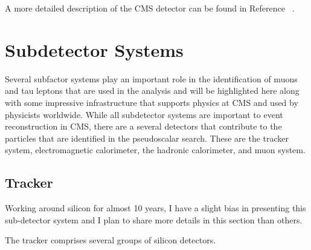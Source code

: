 


A more detailed description of the CMS detector can be found in Reference ~\cite{Chatrchyan:2008zzk}.



\section{Subdetector Systems}
Several subfactor systems play an important role in the identification of muons and tau leptons that are used in the analysis and will be highlighted here along with some impressive infrastructure that supports physics at CMS and used by physicists worldwide. 
While all subdetector systems are important to event reconstruction in CMS, there are a several detectors that contribute to the particles that are identified in the pseudoscalar search. These are the tracker system, electromagnetic calorimeter, the hadronic calorimeter, and muon system. 

\subsection{Tracker}
Working around silicon for almost 10 years, I have a slight bias in presenting this sub-detector system and I plan to share more details in this section than others. 

The tracker comprises several groups of silicon detectors. 


